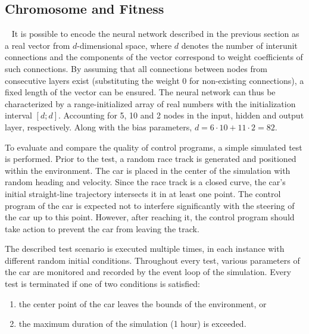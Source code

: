 \subsection{Chromosome and Fitness}~\label{section:car-chromosome}
It is possible to encode the neural network described in the previous section as a real vector from $d$-dimensional space, where $d$ denotes the number of interunit connections and the components of the vector correspond to weight coefficients of such connections. By assuming that all connections between nodes from consecutive layers exist (substituting the weight 0 for non-existing connections), a fixed length of the vector can be ensured. The neural network can thus be characterized by a range-initialized array of real numbers with the initialization interval $[d;d]$. Accounting for 5, 10 and 2 nodes in the input, hidden and output layer, respectively. Along with the bias parameters, $d=6\cdot 10+11\cdot 2=82$.

To evaluate and compare the quality of control programs, a simple simulated test is performed. Prior to the test, a random race track is generated and positioned within the environment. The car is placed in the center of the simulation with random heading and velocity. Since the race track is a closed curve, the car's initial straight-line trajectory intersects it in at least one point. The control program of the car is expected not to interfere significantly with the steering of the car up to this point. However, after reaching it, the control program should take action to prevent the car from leaving the track.

The described test scenario is executed multiple times, in each instance with different random initial conditions. Throughout every test, various parameters of the car are monitored and recorded by the event loop of the simulation. Every test is terminated if one of two conditions is satisfied:
~
\begin{enumerate}
	\item the center point of the car leaves the bounds of the environment, or
	\item the maximum duration of the simulation (1 hour) is exceeded.
\end{enumerate}

